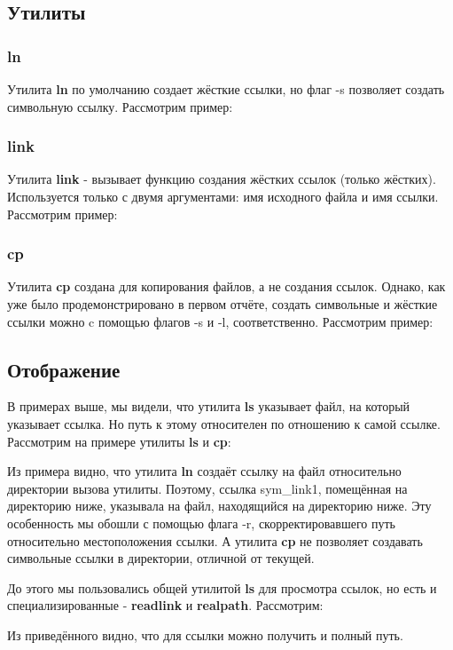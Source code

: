 \documentclass[a4paper]{article}
\begin{document}
\subsection{Утилиты}
\subsubsection{ln}

Утилита \textbf{ln} по умолчанию создает жёсткие ссылки, но флаг -s позволяет создать символьную ссылку. Рассмотрим пример:


\subsubsection{link}

Утилита \textbf{link} - вызывает функцию создания жёстких ссылок (только жёстких). Используется только с двумя аргументами: имя исходного файла и имя ссылки. Рассмотрим пример:


\subsubsection{cp}

Утилита \textbf{cp} создана для копирования файлов, а не создания ссылок. Однако, как уже было продемонстрировано в первом отчёте, создать символьные и жёсткие ссылки можно c помощью флагов -s и -l, соответственно. Рассмотрим пример:


\subsection{Отображение}
В примерах выше, мы видели, что утилита \textbf{ls} указывает файл, на который указывает ссылка. Но путь к этому относителен по отношению к самой ссылке. Рассмотрим на примере утилиты \textbf{ls} и \textbf{cp}:

Из примера видно, что утилита \textbf{ln} создаёт ссылку на файл относительно директории вызова утилиты. Поэтому, ссылка sym\_link1, помещённая на директорию ниже, указывала на файл, находящийся на директорию ниже. Эту особенность мы обошли с помощью флага -r, скорректировавшего путь относительно местоположения ссылки. А утилита \textbf{cp} не позволяет создавать символьные ссылки в директории, отличной от текущей.

До этого мы пользовались общей утилитой \textbf{ls} для просмотра ссылок, но есть и специализированные - \textbf{readlink} и \textbf{realpath}. Рассмотрим:

Из приведённого видно, что для ссылки можно получить и полный путь.
\end{document}
